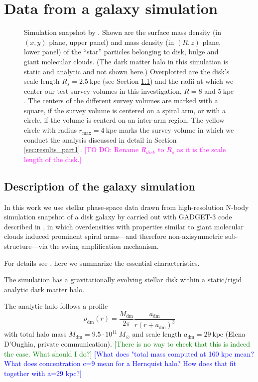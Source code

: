 \documentclass[iop,revtex4,numberedappendix,appendixfloats]{emulateapj}
\newcommand{\Wilma}[1]{\textcolor{Magenta}{#1}}
\newcommand{\HW}[1]{\textcolor{Green}{#1}}
\newcommand{\Jo}[1]{\textcolor{Blue}{#1}}
\begin{document}
\section{Data from a galaxy simulation} \label{sec:simulation}

\begin{figure}[!htbp]
\caption{Simulation snapshot by \citet{2013ApJ...766...34D} . Shown are the surface mass density (in $(x,y)$ plane, upper panel) and mass density (in $(R,z)$ plane, lower panel) of the ``star'' particles belonging to disk, bulge and giant molecular clouds. (The dark matter halo in this simulation is static and analytic and not shown here.) Overplotted are the disk's scale length $R_s=2.5~\text{kpc}$ (see Section \ref{sec:simulation_description}) and the radii at which we center our test survey volumes in this investigation, $R=8$ and $5~\text{kpc}$. The centers of the different survey volumes are marked with a square, if the survey volume is centered on a spiral arm, or with a circle, if the volume is centerd on an inter-arm region. The yellow circle with radius $r_\text{max}=4~\text{kpc}$ marks the survey volume in which we conduct the analysis discussed in detail in Section \ref{sec:results_part1}. \Wilma{[TO DO: Rename $R_{disk}$ to $R_s$ as it is the scale length of the disk.]}}
\label{fig:simulation}
\end{figure}

\subsection{Description of the galaxy simulation} \label{sec:simulation_description}

In this work we use stellar phase-space data drawn from high-resolution N-body simulation snapshot of a disk galaxy by \citet{2013ApJ...766...34D} carried out with GADGET-3 code described in \citet{2005MNRAS.361..776S}, in which overdensities with properties similar to giant molecular clouds induced prominent spiral arms---and therefore non-axisymmetric sub-structure---via the swing amplification mechanism. 

For details see \citet{2013ApJ...766...34D}, here we summarize the essential characteristics.

The simulation has a gravitationally evolving stellar disk within a static/rigid analytic dark matter halo.

The analytic halo follows a \citet{1990ApJ...356..359H} profile
\begin{equation}
\rho_\text{dm}(r) = \frac{M_\text{dm}}{2\pi} \frac{a_\text{dm}}{r (r+a_\text{dm})^3} \label{eq:dm_hernquist}
\end{equation}
with total halo mass $M_\text{dm} = 9.5\cdot 10^{11} ~M_\odot$ and scale length $a_\text{dm} = 29~\text{kpc}$ (Elena D'Onghia, private communication). \HW{[There is no way to check that this is indeed the case. What should I do?]} \Jo{[What does "total mass computed at 160 kpc mean? What does concentration c=9 mean for a Hernquist halo? How does that fit together with a=29 kpc?]}
\end{document}
